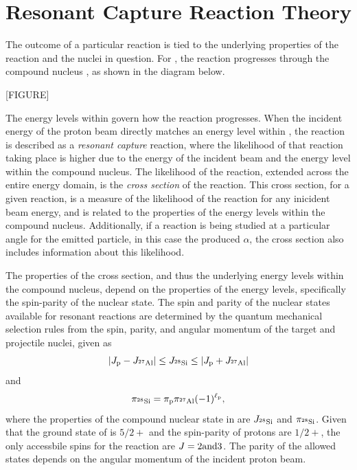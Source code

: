 
\section{Resonant Capture Reaction Theory}

The outcome of a particular reaction is tied to the underlying properties of
the reaction and the nuclei in question. For \alpa{}, the reaction progresses
through the compound nucleus , as shown in the diagram below.

[FIGURE]

The energy levels within  govern how the reaction progresses. When
the incident energy of the proton beam directly matches an energy level within
, the reaction is described as a \emph{resonant capture} reaction,
where the likelihood of that reaction taking place is higher due to the energy
of the incident beam and the energy level within the compound nucleus. The
likelihood of the reaction, extended across the entire energy domain, is the
\emph{cross section} of the reaction. This cross section, for a given reaction,
is a measure of the likelihood of the reaction for any inicident beam energy,
and is related to the properties of the energy levels within the compound
nucleus. Additionally, if a reaction is being studied at a particular angle for
the emitted particle, in this case the produced $\alpha$, the cross section
also includes information about this likelihood.

The properties of the cross section, and thus the underlying energy levels
within the compound nucleus, depend on the properties of the energy levels,
specifically the spin-parity of the nuclear state. The spin and parity of the
nuclear states available for resonant reactions are determined by the quantum
mechanical selection rules from the spin, parity, and angular momentum of the
target and projectile nuclei, given as
\[
    \left|J_{\rm{p}} - J_{{}^{27}\textrm{Al}}\right|
    \leq J_{{}^{28}\textrm{Si}} \leq
    \left|J_{\rm{p}} + J_{{}^{27}\textrm{Al}}\right|
\]
and
\[
    \pi_{{}^{28}\textrm{Si}} = \pi_{\rm{p}}\pi_{{}^{27}\textrm{Al}}(-1)^{\ell_{\rm{p}}},
\]
where the properties of the compound nuclear state in  are
$J_{{}^{28}\textrm{Si}}$ and $\pi_{{}^{28}\textrm{Si}}$. Given that the ground state of
 is $5/2+$ and the spin-parity of protons are $1/2+$, the only
accessbile spins for the reaction are $J = 2\rm{ and }3$. The parity of the
allowed states depends on the angular momentum of the incident proton beam.

